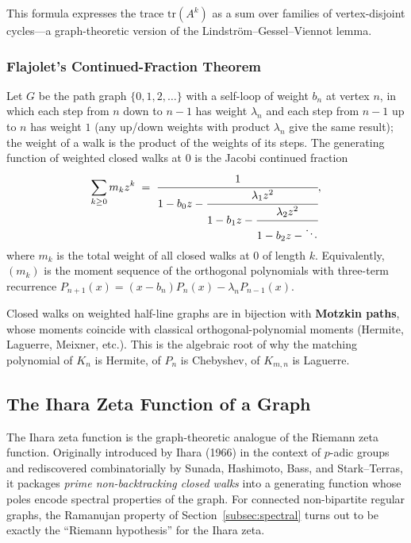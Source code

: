 This formula expresses the trace $\mathrm{tr}(A^k)$ as a sum over
families of vertex-disjoint cycles---a graph-theoretic version of the
Lindstr\"om--Gessel--Viennot lemma.

\subsubsection{Flajolet's Continued-Fraction Theorem}

\begin{theorem}[Flajolet, 1980]\label{thm:flajolet}
Let $G$ be the path graph $\{0, 1, 2, \ldots\}$ with a self-loop of
weight $b_n$ at vertex $n$, in which each step from $n$ down to $n - 1$
has weight $\lambda_n$ and each step from $n - 1$ up to $n$ has weight
$1$ (any up/down weights with product $\lambda_n$ give the same result);
the weight of a walk is the product of the weights of its steps.
The generating function of weighted closed walks at $0$ is the
Jacobi continued fraction
\[
  \sum_{k \ge 0} m_k z^k \;=\; \cfrac{1}{1 - b_0 z - \cfrac{\lambda_1 z^2}{1 - b_1 z - \cfrac{\lambda_2 z^2}{1 - b_2 z - \ddots}}},
\]
where $m_k$ is the total weight of all closed walks at $0$ of length
$k$. Equivalently, $(m_k)$ is the moment sequence of the orthogonal
polynomials with three-term recurrence
$P_{n+1}(x) = (x - b_n) P_n(x) - \lambda_n P_{n-1}(x)$.
\end{theorem}

\begin{corollary}
Closed walks on weighted half-line graphs are in bijection with
\textbf{Motzkin paths}, whose moments coincide with classical
orthogonal-polynomial moments (Hermite, Laguerre, Meixner, etc.).
This is the algebraic root of why the matching polynomial of $K_n$ is
Hermite, of $P_n$ is Chebyshev, of $K_{m,n}$ is Laguerre.
\end{corollary}

\subsection{The Ihara Zeta Function of a Graph}\label{subsec:ihara}

The Ihara zeta function is the graph-theoretic analogue of the
Riemann zeta function. Originally introduced by Ihara (1966) in the
context of $p$-adic groups and rediscovered combinatorially by
Sunada, Hashimoto, Bass, and Stark--Terras, it packages \emph{prime
non-backtracking closed walks} into a generating function whose
poles encode spectral properties of the graph. For connected
non-bipartite regular graphs, the Ramanujan property of Section~\ref{subsec:spectral} turns
out to be exactly the ``Riemann hypothesis'' for the Ihara zeta.

